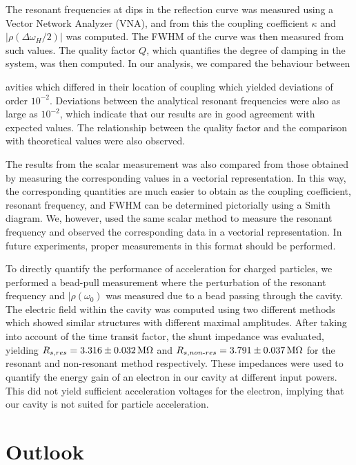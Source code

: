 \documentclass[a4paper]{report}
\numberwithin{equation}{section}
\begin{document}
The resonant frequencies at dips in the reflection curve was measured using a Vector Network Analyzer (VNA), and from this the coupling coefficient $\kappa$
and $|\rho(\Delta\omega_H / 2)|$ was computed. The FWHM of the curve was then measured from such values. The quality factor $Q$, 
which quantifies the degree of damping in the system, was then computed. In our analysis, we compared the behaviour between\par 
avities which differed in their location of coupling which yielded deviations of order $10^{-2}$. Deviations between the 
analytical resonant frequencies were also as large as $10^{-2}$, which indicate that our results are in good agreement with
expected values. The relationship between the quality factor and the comparison with theoretical values were also observed. \par 

The results from the scalar measurement was also compared from those obtained by measuring the corresponding values in a vectorial representation. In this way, the corresponding quantities are much easier to 
obtain as the coupling coefficient, resonant frequency, and FWHM can be determined pictorially using a Smith diagram. We, however,
used the same scalar method to measure the resonant frequency and observed the corresponding data in a vectorial representation. 
In future experiments, proper measurements in this format should be performed. \par 

To directly quantify the performance of acceleration for charged particles, we performed a bead-pull measurement where the 
perturbation of the resonant frequency and $|\rho(\omega_0)$ was measured due to a bead passing through the cavity. The 
electric field within the cavity was computed using two different methods which showed similar structures with different 
maximal amplitudes. After taking into account of the time transit factor, the shunt impedance was evaluated, yielding
$R_{s, res} = \SI{3.316 \pm 0.032}{\mega\ohm}$ and $R_{s, non\text{-}res} = \SI{3.791 \pm 0.037}{\mega\ohm}$ for the 
resonant and non-resonant method respectively. These impedances were used to quantify the energy gain of an electron in our cavity
at different input powers. This did not yield sufficient acceleration voltages for the electron, implying that our cavity is not
suited for particle acceleration. \par 

\section{Outlook}
\end{document}
